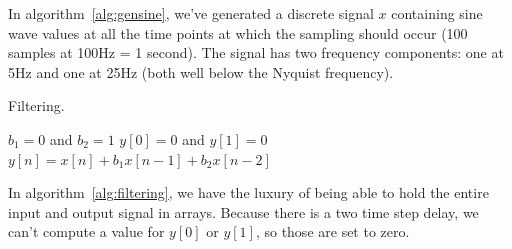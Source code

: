 In algorithm~\ref{alg:gensine}, we've generated a discrete signal $x$ containing sine wave values at all the time points at which
the sampling should occur (100 samples at 100Hz = 1 second). The
signal has two frequency components: one at 5Hz and one at 25Hz (both
well below the Nyquist frequency).

\begin{algorithm}
\caption{Filtering.\label{alg:filtering}}
\begin{algorithmic}
\STATE $b_1=0$ and $b_2=1$
\STATE $y[0]=0$ and $y[1]=0$
   \STATE $y[n] = x[n]+b_1x[n-1]+b_2x[n-2]$
\ENDFOR
\end{algorithmic}
\end{algorithm}

In algorithm~\ref{alg:filtering}, we have the luxury of being able to
hold the entire input and output signal in arrays. Because there is a two time step delay, we
can't compute a value for $y[0]$ or  $y[1]$, so those are set to zero. 



